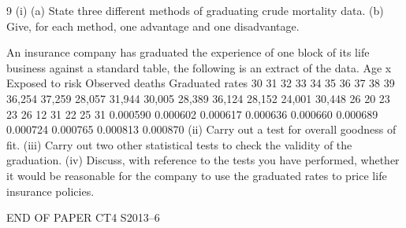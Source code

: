 9
(i)
(a) State three different methods of graduating crude mortality data.
(b) Give, for each method, one advantage and one disadvantage.

An insurance company has graduated the experience of one block of its life business
against a standard table, the following is an extract of the data.
Age x Exposed to
risk Observed
deaths Graduated
rates
30
31
32
33
34
35
36
37
38
39 36,254
37,259
28,057
31,944
30,005
28,389
36,124
28,152
24,001
30,448 26
20
23
23
26
12
31
22
25
31 0.000590
0.000602
0.000617
0.000636
0.000660
0.000689
0.000724
0.000765
0.000813
0.000870
(ii) Carry out a test for overall goodness of fit.
(iii) Carry out two other statistical tests to check the validity of the graduation. 
(iv) Discuss, with reference to the tests you have performed, whether it would be
reasonable for the company to use the graduated rates to price life insurance
policies.

END OF PAPER
CT4 S2013–6



